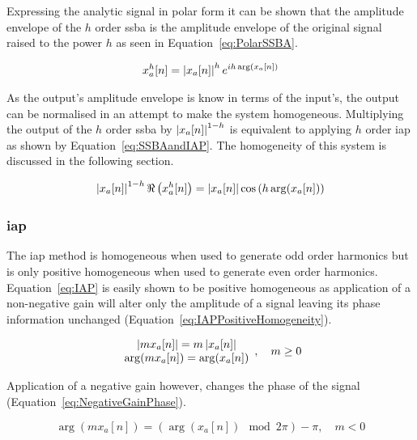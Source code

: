 			Expressing the analytic signal in polar form it can be shown that the amplitude envelope of the
			$h$ order \acrshort{ssba} is the amplitude envelope of the original signal raised to the
			power $h$ as seen in Equation~\ref{eq:PolarSSBA}.

			\begin{gather}
				x_{a}^{h}[n] = \left|x_{a}[n]\right|^{h} e^{ih\arg (x_{a}[n])}
				\label{eq:PolarSSBA}
			\end{gather}

			As the output's amplitude envelope is know in terms of the input's, the output can be normalised in
			an attempt to make the system homogeneous. Multiplying the output of the $h$ order
			\acrshort{ssba} by $\left|x_{a}[n]\right|^{1-h}$ is equivalent to applying $h$ order
			\acrshort{iap} as shown by Equation~\ref{eq:SSBAandIAP}. The homogeneity of this system is
			discussed in the following section.

			\begin{equation}
				\left|x_{a}[n]\right|^{1-h} \Re \left( x_{a}^{h}[n] \right) = 
				\left|x_{a}[n]\right| \cos \left( h\arg(x_{a}[n]) \right)
				\label{eq:SSBAandIAP}
			\end{equation}

		\subsubsection*{\acrshort{iap}}
			The \acrshort{iap} method is homogeneous when used to generate odd order harmonics but is only
			positive homogeneous when used to generate even order harmonics. Equation~\ref{eq:IAP} is easily
			shown to be positive homogeneous as application of a non-negative gain will alter only the
			amplitude of a signal leaving its phase information unchanged
			(Equation~\ref{eq:IAPPositiveHomogeneity}).

			\begin{equation}
				\begin{array}{c}
					\left|mx_{a}[n]\right| = m\left|x_{a}[n]\right| \\
					\arg(mx_{a}[n]) = \arg(x_{a}[n])
				\end{array}
				, \quad m \geq 0
				\label{eq:IAPPositiveHomogeneity}
			\end{equation}

			Application of a negative gain however, changes the phase of the signal
			(Equation~\ref{eq:NegativeGainPhase}).
						
			\begin{equation}
				\arg(mx_{a}[n]) = (\arg(x_{a}[n]) \mod 2\pi) - \pi, \quad m < 0
				\label{eq:NegativeGainPhase}
			\end{equation}

